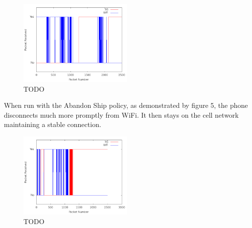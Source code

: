 \begin{figure}
	\includegraphics[width=0.5\textwidth]{leavingCourtyardsNoPolicy}
	\caption{TODO}
\end{figure}

When run with the Abandon Ship policy, as demonstrated by figure 5, the phone disconnects much more promptly from WiFi. It then stays on the cell network maintaining a stable connection. 

\begin{figure}
	\includegraphics[width=0.5\textwidth]{leavingCourtyardsWithPolicy}
	\caption{TODO}
\end{figure}

